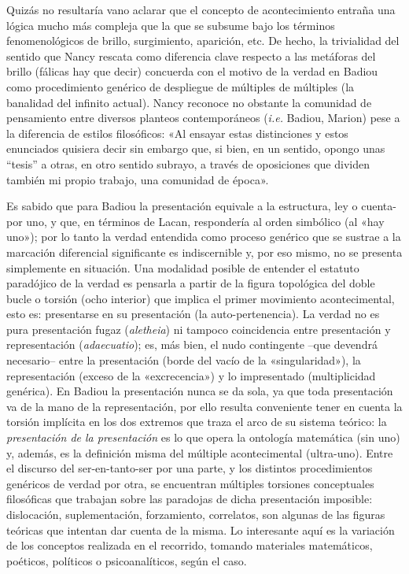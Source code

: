 Quizás no resultaría vano aclarar que el concepto de acontecimiento entraña una lógica mucho más compleja que la que se subsume bajo los términos fenomenológicos de brillo, surgimiento, aparición, etc. De hecho, la trivialidad del sentido que Nancy rescata como diferencia clave respecto a las metáforas del brillo (fálicas hay que decir) concuerda con el motivo de la verdad en Badiou como procedimiento genérico de despliegue de múltiples de múltiples (la banalidad del infinito actual). Nancy reconoce no obstante la comunidad de pensamiento entre diversos planteos contemporáneos (\emph{i.e.} Badiou, Marion) pese a la diferencia de estilos filosóficos: «Al ensayar estas distinciones y estos enunciados quisiera decir sin embargo que, si bien, en un sentido, opongo unas ``tesis'' a otras, en otro sentido subrayo, a través de oposiciones que dividen también mi propio trabajo, una comunidad de época».

Es sabido que para Badiou la presentación equivale a la estructura, ley o cuenta-por uno, y que, en términos de Lacan, respondería al orden simbólico (al «hay uno»); por lo tanto la verdad entendida como proceso genérico que se sustrae a la marcación diferencial significante es indiscernible y, por eso mismo, no se presenta simplemente en situación. Una modalidad posible de entender el estatuto paradójico de la verdad es pensarla a partir de la figura topológica del doble bucle o torsión (ocho interior) que implica el primer movimiento acontecimental, esto es: presentarse en su presentación (la auto-pertenencia). La verdad no es pura presentación fugaz (\emph{aletheia}) ni tampoco coincidencia entre presentación y representación (\emph{adaecuatio}); es, más bien, el nudo contingente --que devendrá necesario-- entre la presentación (borde del vacío de la «singularidad»), la representación (exceso de la «excrecencia») y lo impresentado (multiplicidad genérica). En Badiou la presentación nunca se da sola, ya que toda presentación va de la mano de la representación, por ello resulta conveniente tener en cuenta la torsión implícita en los dos extremos que traza el arco de su sistema teórico: la \emph{presentación de la presentación} es lo que opera la ontología matemática (sin uno) y, además, es la definición misma del múltiple acontecimental (ultra-uno). Entre el discurso del ser-en-tanto-ser por una parte, y los distintos procedimientos genéricos de verdad por otra, se encuentran múltiples torsiones conceptuales filosóficas que trabajan sobre las paradojas de dicha presentación imposible: dislocación, suplementación, forzamiento, correlatos, son algunas de las figuras teóricas que intentan dar cuenta de la misma. Lo interesante aquí es la variación de los conceptos realizada en el recorrido, tomando materiales matemáticos, poéticos, políticos o psicoanalíticos, según el caso.

